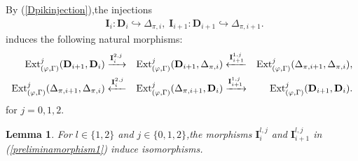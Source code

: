 \documentclass[SecEq,CM,GP]{degruyter-crelle} %
\theoremstyle{plain}
\newtheorem{lem}[thm]{Lemma}
\newcommand{\Dpik}{{\mathbf{D}}}
\newcommand{\ext}{{\rm Ext}}
\newcommand{\gr}{{\rm gr}}
\newcommand{\tee}{{{\otimes}_{\cR_{E,L}}}}
\newcommand{\bh}{{\mathbf{h}}}
\newcommand{\cR}{\mathcal R}
\newcommand{\cF}{\mathcal F}
\begin{document}
By (\ref{Dpikinjection}),\;the injections
\begin{equation*}
\begin{aligned}
	&\mathbf{I}_{i}:\Dpik_{i}\hookrightarrow \Delta_{\pi,i},\;\mathbf{I}_{i+1}:\Dpik_{i+1}  \hookrightarrow \Delta_{\pi,i+1}.\;
\end{aligned}
\end{equation*}
induces the following natural morphisms:
\begin{equation}\label{preliminamorphism1}
\begin{aligned}
	\ext^j_{(\varphi,\Gamma)}(\Dpik_{i+1},\Dpik_{i}) & \xrightarrow{\mathbf{I}_{i}^{2,j}}  & \ext^j_{(\varphi,\Gamma)}(\Dpik_{i+1},\Delta_{\pi,i}) & \xleftarrow{\mathbf{I}_{i+1}^{1,j}} & \ext^j_{(\varphi,\Gamma)}(\Delta_{\pi,i+1},\Delta_{\pi,i}),\\
	\ext^j_{(\varphi,\Gamma)}(\Delta_{\pi,i+1},\Delta_{\pi,i}) & \xleftarrow{\mathbf{I}_{i}^{2,j}} & \ext^j_{(\varphi,\Gamma)}(\Delta_{\pi,i+1},\Dpik_{i})& \xrightarrow{\mathbf{I}_{i+1}^{1,j}} & \ext^j_{(\varphi,\Gamma)}(\Dpik_{i+1},\Dpik_{i}).
\end{aligned}
\end{equation}
for $j=0,1,2$.\;
\begin{lem}\label{pullbackforiso}For $l\in \{1,2\}$ and $j\in\{0,1,2\}$,\;the morphisms $\mathbf{I}_{i}^{l,j}$ and $\mathbf{I}_{i+1}^{l,j}$ in (\ref{preliminamorphism1}) induce isomorphisms.\;
\end{lem}
\end{document}
